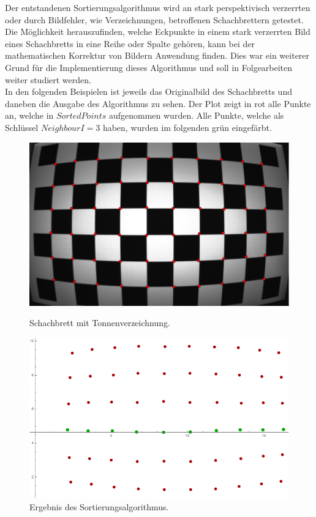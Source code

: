 Der entstandenen Sortierungsalgorithmus wird an stark perspektivisch verzerrten oder durch Bildfehler, wie Verzeichnungen, betroffenen Schachbrettern getestet. Die Möglichkeit herauszufinden, welche Eckpunkte in einem stark verzerrten Bild eines Schachbretts in eine Reihe oder Spalte gehören, kann bei der mathematischen Korrektur von Bildern Anwendung finden. Dies war ein weiterer Grund für die Implementierung dieses Algorithmus und soll in Folgearbeiten weiter studiert werden. \\


In den folgenden Beispielen ist jeweils das Originalbild des Schachbretts und daneben die Ausgabe des Algorithmus zu sehen. Der Plot zeigt in rot alle Punkte an, welche in $SortedPoints$ aufgenommen wurden. Alle Punkte, welche als Schlüssel $NeighbourI = 3$ haben, wurden im folgenden grün eingefärbt.


\begin{figure}[!htb]
	\includegraphics[width=\linewidth]{images/Tonnenverzeichnung.png}
	\caption[Schachbrett mit Tonnenverzeichnung]{Schachbrett mit Tonnenverzeichnung.}
	\label{fig:Extreme1}
	\endminipage\hfill
	\includegraphics[width=\linewidth]{images/AlgTonnenverzeichnung.png}
	\caption[Sortierte Punkte eines Schachbretts mit Tonnenverzeichnung]{Ergebnis des Sortierungsalgorithmus.}
	\label{fig:Extreme2}
	\endminipage\hfill
\end{figure}

